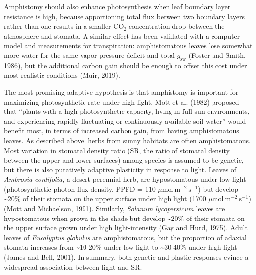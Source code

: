 \documentclass[
  letterpaper,
  DIV=11,
  numbers=noendperiod]{scrartcl}
\begin{document}
Amphistomy should also enhance photosynthesis when leaf boundary layer
resistance is high, because apportioning total flux between two boundary
layers rather than one results in a smaller CO\(_2\) concentration drop
between the atmosphere and stomata. A similar effect has been validated
with a computer model and measurements for transpiration: amphistomatous
leaves lose somewhat more water for the same vapor pressure deficit and
total \(g_\mathrm{sw}\) (Foster and Smith, 1986), but the additional
carbon gain should be enough to offset this cost under most realistic
conditions (Muir, 2019).

The most promising adaptive hypothesis is that amphistomy is important
for maximizing photosynthetic rate under high light. Mott et al. (1982)
proposed that ``plants with a high photosynthetic capacity, living in
full-sun environments, and experiencing rapidly fluctuating or
continuously available soil water'' would benefit most, in terms of
increased carbon gain, from having amphistomatous leaves. As described
above, herbs from sunny habitats are often amphistomatous. Most
variation in stomatal density ratio (\(\mathrm{SR}\), the ratio of
stomatal density between the upper and lower surfaces) among species is
assumed to be genetic, but there is also putatively adaptive plasticity
in response to light. Leaves of \emph{Ambrosia cordifolia}, a desert
perennial herb, are hypostomatous under low light (photosynthetic photon
flux density, PPFD = 110 \(\mu \text{mol}~\text{m}^{-2}~\text{s}^{-1}\))
but develop \textasciitilde20\% of their stomata on the upper surface
under high light (1700 \(\mu \text{mol}~\text{m}^{-2}~\text{s}^{-1}\))
(Mott and Michaelson, 1991). Similarly, \emph{Solanum lycopersicum}
leaves are hypostomatous when grown in the shade but develop
\textasciitilde20\% of their stomata on the upper surface grown under
high light-intensity (Gay and Hurd, 1975). Adult leaves of
\emph{Eucalyptus globulus} are amphistomatous, but the proportion of
adaxial stomata increases from \textasciitilde10-20\% under low light to
\textasciitilde30-40\% under high light (James and Bell, 2001). In
summary, both genetic and plastic responses evince a widespread
association between light and \(\mathrm{SR}\).
\end{document}

